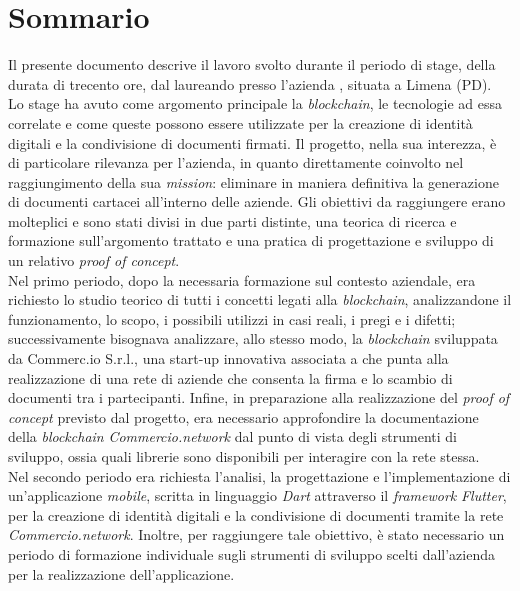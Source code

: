 
\cleardoublepage
{}
{}
\begingroup
\let\clearpage\relax
\let\cleardoublepage\relax
\let\cleardoublepage\relax

\chapter*{Sommario}

Il presente documento descrive il lavoro svolto durante il periodo di stage, della durata di trecento ore, dal laureando \myName{} presso l'azienda \myCompany{} \companyTitle{}, situata a Limena (PD).\\
Lo stage ha avuto come argomento principale la \textit{blockchain}, le tecnologie ad essa correlate e come queste possono essere utilizzate per la creazione di identità digitali e la condivisione di documenti firmati. Il progetto, nella sua interezza, è di particolare rilevanza per l'azienda, in quanto direttamente coinvolto nel raggiungimento della sua \textit{mission}: eliminare in maniera definitiva la generazione di documenti cartacei all'interno delle aziende.
Gli obiettivi da raggiungere erano molteplici e sono stati divisi in due parti distinte, una teorica di ricerca e formazione sull'argomento trattato e una pratica di progettazione e sviluppo di un relativo \textit{proof of concept}.\\
Nel primo periodo, dopo la necessaria formazione sul contesto aziendale, era richiesto lo studio teorico di tutti i concetti legati alla \textit{blockchain}, analizzandone il funzionamento, lo scopo, i possibili utilizzi in casi reali, i pregi e i difetti; successivamente bisognava analizzare, allo stesso modo, la \textit{blockchain} sviluppata da Commerc.io S.r.l., una start-up innovativa associata a \myCompany{} \companyTitle{} che punta alla realizzazione di una rete di aziende che consenta la firma e lo scambio di documenti tra i partecipanti. Infine, in preparazione alla realizzazione del \textit{proof of concept} previsto dal progetto, era necessario approfondire la documentazione della \textit{blockchain} \textit{Commercio.network} dal punto di vista degli strumenti di sviluppo, ossia quali librerie sono disponibili per interagire con la rete stessa.\\
Nel secondo periodo era richiesta l'analisi, la progettazione e l'implementazione di un'applicazione \textit{mobile}, scritta in linguaggio \textit{Dart} attraverso il \textit{framework} \textit{Flutter}, per la creazione di identità digitali e la condivisione di documenti tramite la rete \textit{Commercio.network}. Inoltre, per raggiungere tale obiettivo, è stato necessario un periodo di formazione individuale sugli strumenti di sviluppo scelti dall'azienda per la realizzazione dell'applicazione.

%
%

\endgroup			

\vfill

